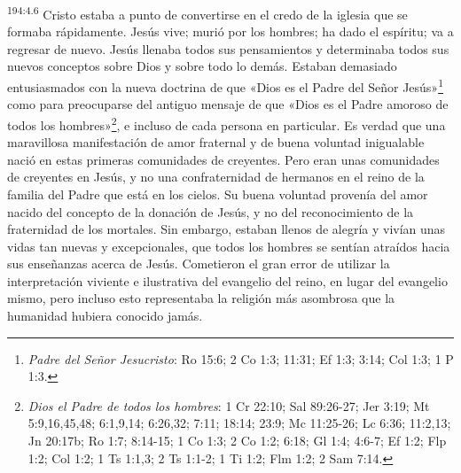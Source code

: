 \par 
\textsuperscript{194:4.6} Cristo estaba a punto de convertirse en el credo de la iglesia que se formaba rápidamente. Jesús vive; murió por los hombres; ha dado el espíritu; va a regresar de nuevo. Jesús llenaba todos sus pensamientos y determinaba todos sus nuevos conceptos sobre Dios y sobre todo lo demás. Estaban demasiado entusiasmados con la nueva doctrina de que «Dios es el Padre del Señor Jesús»\footnote{\textit{Padre del Señor Jesucristo}: Ro 15:6; 2 Co 1:3; 11:31; Ef 1:3; 3:14; Col 1:3; 1 P 1:3.} como para preocuparse del antiguo mensaje de que «Dios es el Padre amoroso de todos los hombres»\footnote{\textit{Dios el Padre de todos los hombres}: 1 Cr 22:10; Sal 89:26-27; Jer 3:19; Mt 5:9,16,45,48; 6:1,9,14; 6:26,32; 7:11; 18:14; 23:9; Mc 11:25-26; Lc 6:36; 11:2,13; Jn 20:17b; Ro 1:7; 8:14-15; 1 Co 1:3; 2 Co 1:2; 6:18; Gl 1:4; 4:6-7; Ef 1:2; Flp 1:2; Col 1:2; 1 Ts 1:1,3; 2 Ts 1:1-2; 1 Ti 1:2; Flm 1:2; 2 Sam 7:14.}, e incluso de cada persona en particular. Es verdad que una maravillosa manifestación de amor fraternal y de buena voluntad inigualable nació en estas primeras comunidades de creyentes. Pero eran unas comunidades de creyentes en Jesús, y no una confraternidad de hermanos en el reino de la familia del Padre que está en los cielos. Su buena voluntad provenía del amor nacido del concepto de la donación de Jesús, y no del reconocimiento de la fraternidad de los mortales. Sin embargo, estaban llenos de alegría y vivían unas vidas tan nuevas y excepcionales, que todos los hombres se sentían atraídos hacia sus enseñanzas acerca de Jesús. Cometieron el gran error de utilizar la interpretación viviente e ilustrativa del evangelio del reino, en lugar del evangelio mismo, pero incluso esto representaba la religión más asombrosa que la humanidad hubiera conocido jamás.

